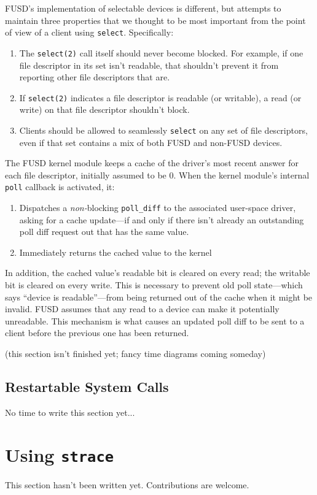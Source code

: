 \documentclass{article}
\begin{document}
FUSD's implementation of selectable devices is different, but attempts
to maintain three properties that we thought to be most important from
the point of view of a client using {\tt select}.  Specifically:
\begin{enumerate}
\item The {\tt select(2)} call itself should never become blocked.
For example, if one file descriptor in its set isn't readable, that
shouldn't prevent it from reporting other file descriptors that are.
\item If {\tt select(2)} indicates a file descriptor is readable (or
writable), a read (or write) on that file descriptor shouldn't block.
\item Clients should be allowed to seamlessly {\tt select} on any set
of file descriptors, even if that set contains a mix of both FUSD and
non-FUSD devices.
\end{enumerate}


The FUSD kernel module keeps a cache of the driver's most recent
answer for each file descriptor, initially assumed to be 0.  When the
kernel module's internal {\tt poll} callback is activated, it:
\begin{enumerate}
\item Dispatches a {\em non-}blocking {\tt poll\_diff} to the
associated user-space driver, asking for a cache update---if and only
if there isn't already an outstanding poll diff request out that has
the same value.
\item Immediately returns the cached value to the kernel
\end{enumerate}

In addition, the cached value's readable bit is cleared on every read;
the writable bit is cleared on every write.  This is necessary to
prevent old poll state---which says ``device is readable''---from
being returned out of the cache when it might be invalid.  FUSD
assumes that any read to a device can make it potentially unreadable.
This mechanism is what causes an updated poll diff to be sent to a
client before the previous one has been returned.

(this section isn't finished yet; fancy time diagrams coming someday)

\subsection{Restartable System Calls}

No time to write this section yet...


\appendix

\section{Using {\tt strace}}
\label{strace}

This section hasn't been written yet.  Contributions are welcome.
\end{document}
